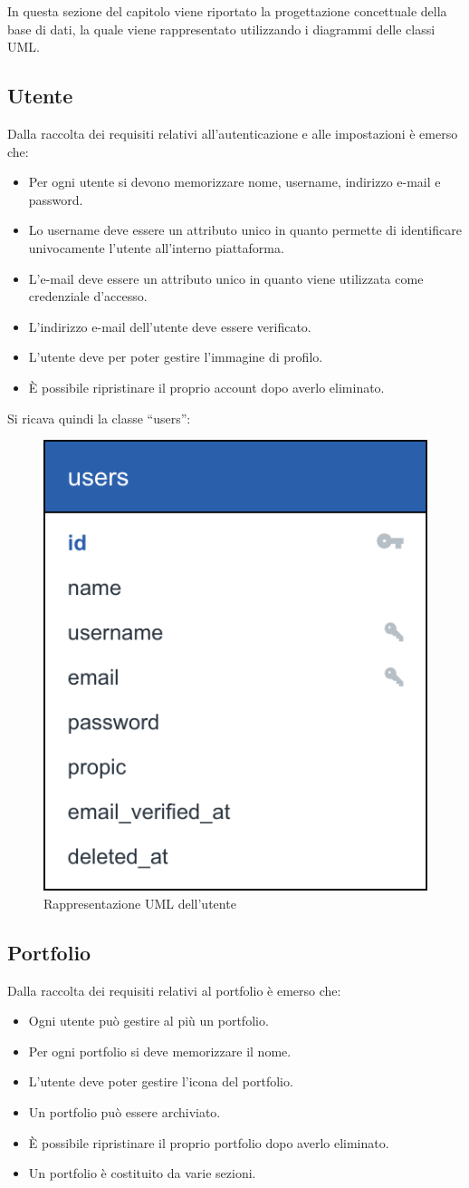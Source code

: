 In questa sezione del capitolo viene riportato la progettazione concettuale della base di dati, la quale viene rappresentato utilizzando i diagrammi delle classi UML.

\subsection{Utente}
Dalla raccolta dei requisiti relativi all'autenticazione e alle impostazioni \`e emerso che:
\begin{itemize}
	\item Per ogni utente si devono memorizzare nome, username, indirizzo e-mail e password.
	\item Lo username deve essere un attributo unico in quanto permette di identificare univocamente l'utente all'interno piattaforma.
	\item L'e-mail deve essere un attributo unico in quanto viene utilizzata come credenziale d'accesso.
	\item L'indirizzo e-mail dell'utente deve essere verificato.
	\item L'utente deve per poter gestire l'immagine di profilo.
	\item \`E possibile ripristinare il proprio account dopo averlo eliminato.	
\end{itemize}

Si ricava quindi la classe ``users'':
\begin{figure}[htbp]
	\centering
	\includegraphics[height=0.35\linewidth]{figure/users_db}
	\caption{Rappresentazione UML dell'utente}
	\label{fig:users_db}
\end{figure}

\subsection{Portfolio}
Dalla raccolta dei requisiti relativi al portfolio \`e emerso che:
\begin{itemize}
	\item Ogni utente pu\`o gestire al pi\`u un portfolio.
	\item Per ogni portfolio si deve memorizzare il nome.
	\item L'utente deve poter gestire l'icona del portfolio.
	\item Un portfolio pu\`o essere archiviato.
	\item \`E possibile ripristinare il proprio portfolio dopo averlo eliminato.
	\item Un portfolio \`e costituito da varie sezioni.
\end{itemize}

